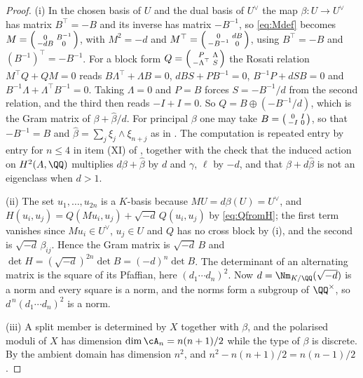 \begin{proof}
(i) In the chosen basis of $U$ and the dual basis of $U^{\vee}$ the map
$\beta\colon U\to U^{\vee}$ has matrix $B^{\top}=-B$ and its inverse has
matrix $-B^{-1}$, so \eqref{eq:Mdef} becomes
$M=\begin{psmallmatrix}0&B^{-1}\\-dB&0\end{psmallmatrix}$, with
$M^{2}=-d$ and
$M^{\top}=\begin{psmallmatrix}0&dB\\-B^{-1}&0\end{psmallmatrix}$, using
$B^{\top}=-B$ and $(B^{-1})^{\top}=-B^{-1}$. For a block form
$Q=\begin{psmallmatrix}P&\Lambda\\-\Lambda^{\top}&S\end{psmallmatrix}$ the
Rosati relation $M^{\top}Q+QM=0$ reads
$B\Lambda^{\top}+\Lambda B=0$, $dBS+PB^{-1}=0$, $B^{-1}P+dSB=0$ and
$B^{-1}\Lambda+\Lambda^{\top}B^{-1}=0$. Taking $\Lambda=0$ and $P=B$ forces
$S=-B^{-1}/d$ from the second relation, and the third then reads $-I+I=0$.
So $Q=B\oplus(-B^{-1}/d)$, which is the Gram matrix of
$\beta+\widehat\beta/d$. For principal $\beta$ one may take
$B=\begin{psmallmatrix}0&I\\-I&0\end{psmallmatrix}$, so that $-B^{-1}=B$
and $\widehat\beta=\sum_{j}\xi_{j}\wedge\xi_{n+j}$ as in
. The computation is repeated entry by entry for
$n\le4$ in item (XI) of , together with the check
that the induced action on $H^{2}(A,\QQ)$ multiplies $d\beta+\widehat\beta$
by $d$ and $\gamma$, $\ell$ by $-d$, and that $\beta+d\widehat\beta$ is not
an eigenclass when $d>1$.

(ii) The set $u_{1},\dots,u_{2n}$ is a $K$-basis because
$MU=d\beta(U)=U^{\vee}$, and $H(u_{i},u_{j})=Q(Mu_{i},u_{j})+\sqrt{-d}\,Q(u_{i},u_{j})$
by \eqref{eq:QfromH}; the first term vanishes since $Mu_{i}\in U^{\vee}$,
$u_{j}\in U$ and $Q$ has no cross block by (i), and the second is
$\sqrt{-d}\,\beta_{ij}$. Hence the Gram matrix is $\sqrt{-d}\,B$ and
$\det H=(\sqrt{-d})^{2n}\det B=(-d)^{n}\det B$. The determinant of an
alternating matrix is the square of its Pfaffian, here $(d_{1}\cdots
d_{n})^{2}$. Now $d=\Nm_{K/\QQ}(\sqrt{-d})$ is a norm and every square is a
norm, and the norms form a subgroup of $\QQ^{\times}$, so
$d^{\,n}(d_{1}\cdots d_{n})^{2}$ is a norm.

(iii) A split member is determined by $X$ together with $\beta$, and the
polarised moduli of $X$ has dimension $\dim\cA_{n}=n(n+1)/2$ while the type of
$\beta$ is discrete. By  the ambient domain has
dimension $n^{2}$, and $n^{2}-n(n+1)/2=n(n-1)/2$.


\end{proof}
